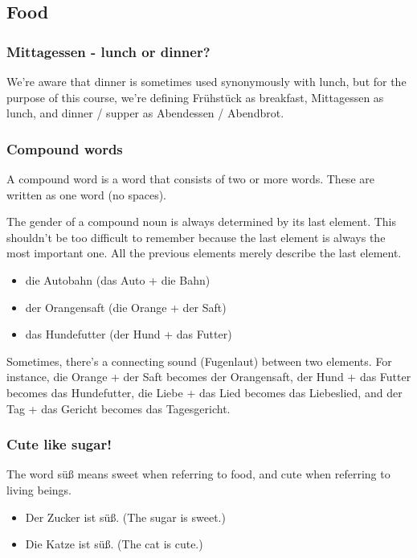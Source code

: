 \pagebreak
\subsection{Food}

\subsubsection{Mittagessen - lunch or dinner?}

We're aware that dinner is sometimes used synonymously with lunch, but for the purpose of this course, we're defining Fr{\"u}hst{\"u}ck as breakfast, Mittagessen as lunch, and dinner / supper as Abendessen / Abendbrot.

\subsubsection{Compound words}

A compound word is a word that consists of two or more words. These are written as one word (no spaces).

The gender of a compound noun is always determined by its last element. This shouldn't be too difficult to remember because the last element is always the most important one. All the previous elements merely describe the last element.
\begin{itemize}
  \item  die Autobahn (das Auto + die Bahn)
	\item  der Orangensaft (die Orange + der Saft)
	\item  das Hundefutter (der Hund + das Futter)
\end{itemize}

Sometimes, there's a connecting sound (Fugenlaut) between two elements. For instance, die Orange + der Saft becomes der Orangensaft, der Hund + das Futter becomes das Hundefutter, die Liebe + das Lied becomes das Liebeslied, and der Tag + das Gericht becomes das Tagesgericht.

\subsubsection{Cute like sugar!}

The word s{\"u}{\ss} means sweet when referring to food, and cute when referring to living beings.
\begin{itemize}
  \item  Der Zucker ist s{\"u}{\ss}. (The sugar is sweet.)
	\item  Die Katze ist s{\"u}{\ss}. (The cat is cute.)
\end{itemize}
    

